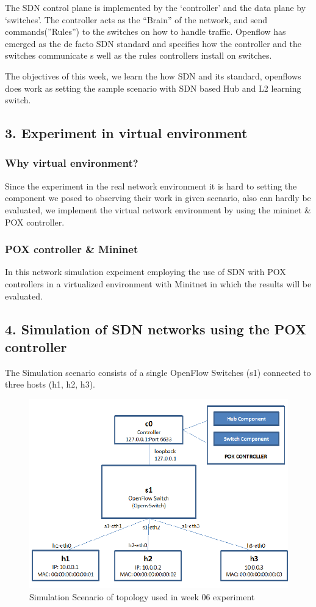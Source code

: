 The SDN control plane is implemented by the ‘controller’ and the data plane by ‘switches’. The controller acts as the “Brain” of the network, and send commands(”Rules”) to the switches on how to handle traffic. 
Openflow has emerged as the de facto SDN standard and specifies how the controller and the switches communicate s well as the rules controllers install on switches.

The objectives of this week, we learn the how SDN and its standard, openflows does work as setting the sample scenario with SDN based Hub and L2 learning switch. 

\subsection*{3. Experiment in virtual environment}
\subsubsection*{Why virtual environment?}
Since the experiment in the real network environment it is hard to setting the component we posed to observing their work in given scenario, also can hardly be evaluated, we implement the virtual network environment by using the mininet \& POX controller.  
\subsubsection*{POX controller \& Mininet}
In this network simulation expeiment employing the use of SDN with POX controllers in a virtualized environment with Minitnet in which the results will be evaluated.
\subsection*{4. Simulation of SDN networks using the POX controller}
The Simulation scenario consists of a single OpenFlow Switches (s1) connected to three hosts (h1, h2, h3).\\
\vspace{-4mm}
\begin{figure}[!h]\centering 
	\includegraphics[width=.6\textwidth]{image/week06/0-1.png}
	\caption{\footnotesize 
	Simulation Scenario of topology used in week 06 experiment}
	\vspace{-10pt}
\end{figure}

